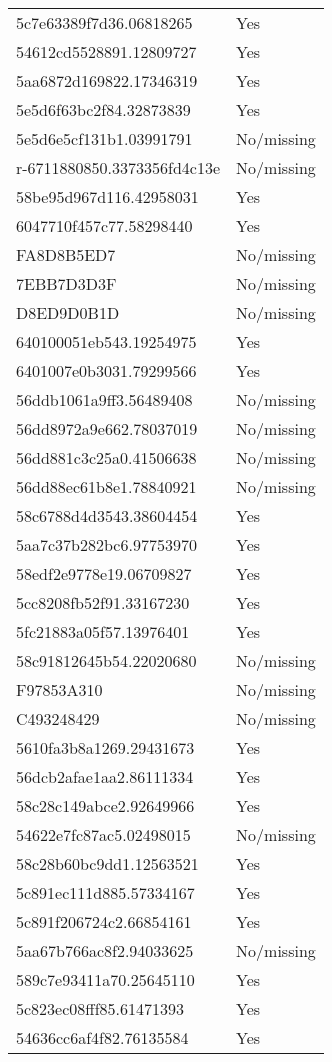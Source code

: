 \begin{tabular}{ll}
5c7e63389f7d36.06818265 & Yes \\
54612cd5528891.12809727 & Yes \\
5aa6872d169822.17346319 & Yes \\
5e5d6f63bc2f84.32873839 & Yes \\
5e5d6e5cf131b1.03991791 & No/missing \\
r-6711880850.3373356fd4c13e & No/missing \\
58be95d967d116.42958031 & Yes \\
6047710f457c77.58298440 & Yes \\
FA8D8B5ED7 & No/missing \\
7EBB7D3D3F & No/missing \\
D8ED9D0B1D & No/missing \\
640100051eb543.19254975 & Yes \\
6401007e0b3031.79299566 & Yes \\
56ddb1061a9ff3.56489408 & No/missing \\
56dd8972a9e662.78037019 & No/missing \\
56dd881c3c25a0.41506638 & No/missing \\
56dd88ec61b8e1.78840921 & No/missing \\
58c6788d4d3543.38604454 & Yes \\
5aa7c37b282bc6.97753970 & Yes \\
58edf2e9778e19.06709827 & Yes \\
5cc8208fb52f91.33167230 & Yes \\
5fc21883a05f57.13976401 & Yes \\
58c91812645b54.22020680 & No/missing \\
F97853A310 & No/missing \\
C493248429 & No/missing \\
5610fa3b8a1269.29431673 & Yes \\
56dcb2afae1aa2.86111334 & Yes \\
58c28c149abce2.92649966 & Yes \\
54622e7fc87ac5.02498015 & No/missing \\
58c28b60bc9dd1.12563521 & Yes \\
5c891ec111d885.57334167 & Yes \\
5c891f206724c2.66854161 & Yes \\
5aa67b766ac8f2.94033625 & No/missing \\
589c7e93411a70.25645110 & Yes \\
5c823ec08fff85.61471393 & Yes \\
54636cc6af4f82.76135584 & Yes \\

\end{tabular}
